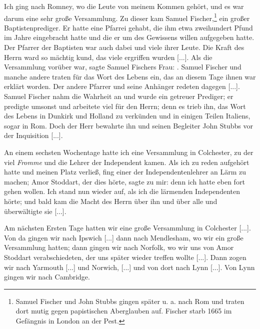 Ich ging nach Romney, wo die Leute von meinem Kommen
gehört, und es war darum eine sehr große Versammlung. Zu
dieser kam Samuel Fischer,\footnote{Samuel Fischer und John 
Stubbs gingen später u. a. nach Rom und
traten dort mutig gegen papistischen Aberglauben auf. 
Fischer starb 1665 im Gefängnis in London an der Pest.}
 ein 
großer Baptistenprediger. Er
hatte eine Pfarrei gehabt, die ihm etwa zweihundert Pfund im
Jahre eingebracht hatte und die er um des Gewissens willen 
aufgegeben hatte. Der Pfarrer der Baptisten war auch dabei und
viele ihrer Leute. Die Kraft des Herrn ward so mächtig kund,
das viele ergriffen wurden [...]. Als die Versammlung vorüber
war, sagte Samuel Fischers Frau: .
Samuel Fischer und manche andere traten für das Wort des
Lebens ein, das an diesem Tage ihnen war erklärt worden. Der
andere Pfarrer und seine Anhänger redeten dagegen [...].
Samuel Fischer nahm die Wahrheit an und wurde ein getreuer
Prediger; er predigte umsonst und arbeitete viel für den Herrn;
denn es trieb ihn, das Wort des Lebens in Dunkirk 
und Holland zu verkünden und in einigen 
Teilen Italiens, sogar in Rom.
Doch der Herr bewahrte ihn und seinen Begleiter John Stubbs
vor der Inquisition [...].


An einem sechsten Wochentage hatte ich eine Versammlung
in Colchester, zu der viel \textit{Fromme} 
und die Lehrer der Independent kamen. Als ich zu reden 
aufgehört hatte und meinen Platz verließ, fing einer 
der Independentenlehrer an Lärm zu
machen; Amor Stoddart, der dies 
hörte, sagte zu mir:  
denn ich hatte eben fort gehen wollen.
Ich stand nun wieder auf, als ich die lärmenden Independenten
hörte; und bald kam die Macht des Herrn über ihn und über
alle und überwältigte sie [...].


Am nächsten Ersten Tage hatten wir eine große Versammlung
in Colchester [...]. Von da gingen wir 
nach Ipswich [...] dann
nach Mendlesham, wo wir ein große Versammlung 
hatten; dann gingen wir nach Norfolk, wo wir 
uns von Amor Stoddart verabschiedeten, 
der uns später wieder treffen wollte [...]. Dann
zogen wir nach Yarmouth [...] und 
Norwich, [...] und von
dort nach Lynn [...]. Von Lynn gingen wir nach 
Cambridge.


